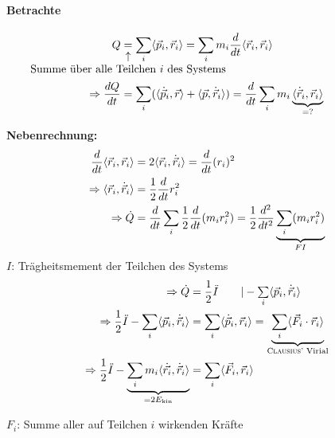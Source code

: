 \paragraph{Betrachte}
\begin{align*}
    Q &\underset{\mathclap{
        \begin{array}{c}
            \uparrow \\
            \text{Summe über alle Teilchen $i$ des Systems}
        \end{array}
        }}{=} \sum\limits_{i} \langle\vec p_i, \vec r_i\rangle = \sum\limits_{i} m_i \frac{d}{dt} \langle\vec r_i, \vec r_i\rangle\\
        \Rightarrow \frac{dQ}{dt} &= \sum\limits_{i} (\langle\dot{\vec{p}}_i, \vec r\rangle + \langle\vec p, \dot{\vec{r}}_i\rangle)
        = \frac{d}{dt} \sum\limits_i m_i \underbrace{\langle\dot{\vec{r}}_i, \vec{r}_i\rangle}_{= ?}
\end{align*}

\color{OliveGreen}
\textbf{Nebenrechnung:}
\begin{align*}
    \frac{d}{dt} \langle\vec{r}_i, \vec{r}_i\rangle &= 2 \langle\vec{r}_i, \dot{\vec{r}}_i\rangle = \frac{d}{dt} (r_i)^2 \\
    \Rightarrow \langle\vec{r}_i, \dot{\vec{r}}_i\rangle &= \frac{1}{2} \frac{d}{dt} r_i^2 \\
\color{black}
\Rightarrow \dot Q &\color{black}=\frac{d}{dt} \sum_i \frac{1}{2} \frac{d}{dt} (m_i r_i^2) = \frac{1}{2} \frac{d^2}{dt^2} \underbrace{\sum\limits_i (m_i r_i^2)}_{FI}
\end{align*}
\color{black}
$I$: Trägheitsmement der Teilchen des Systems
\begin{align*}
    \Rightarrow \dot Q &= \frac{1}{2} \ddot I    \tag*{$| - \sum\limits_i \langle \vec p_i, \dot{\vec{r}}_i\rangle$} \\
    \Rightarrow \frac{1}{2}\ddot I - \sum\limits_i \langle \vec p_i, \dot{\vec{r}}_i\rangle &= \sum\limits_i \langle \dot{\vec{p}}_i, \vec{r}_i\rangle = \underbrace{\sum\limits_i \langle\vec F_i \cdot \vec r_i\rangle}_{\text{\textsc{Clausius}' Virial}} \\
    \Rightarrow \frac{1}{2}\ddot I - \underbrace{\sum\limits_i m_i \langle \dot{\vec{r_i}}, \dot{\vec{r}}_i\rangle}_{= 2 E_{\mathrm{kin}}} &= \sum\limits_i \langle \vec{F}_i, \vec{r}_i\rangle \\
\end{align*}

$F_i$: Summe aller auf Teilchen $i$ wirkenden Kräfte

